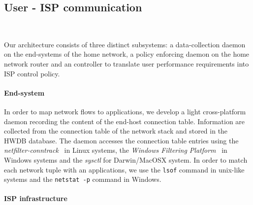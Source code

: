 

\subsection{User - ISP communication} ~\label{s:qos:architecture}

Our architecture consists of three distinct subsystems: a data-collection daemon
on the end-systems of the home network, a policy enforcing daemon on the home
network router and an \of controller to translate user performance requirements
into ISP control policy.

\paragraph*{End-system}

In order to map network flows to applications, we develop a light cross-platform
daemon recording the content of the end-host connection table.
Information are collected from the connection table of the network
stack and stored in the HWDB database. The daemon accesses the connection table
entries using the {\it netfilter-conntrack}~\cite{netfilter} in Linux systems,
the {\it Windows Filtering Platform}~\cite{win-wfp} in Windows systems and the
{\it sysctl} \/for Darwin/MacOSX system. 
In order to match each network tuple
with an applications, we use the {\tt lsof} command in unix-like
systems and the {\tt netstat -p} command in Windows.

\paragraph*{ISP infrastructure}


